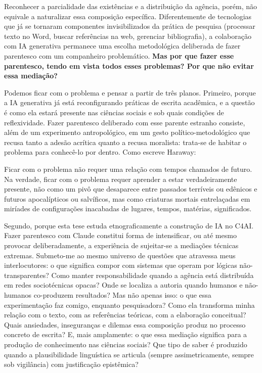 Reconhecer a parcialidade das existências e a distribuição da agência, porém, não equivale a naturalizar essa composição específica. Diferentemente de tecnologias que já se tornaram componentes invisibilizados da prática de pesquisa (processar texto no Word, buscar referências na web, gerenciar bibliografia), a colaboração com IA generativa permanece uma escolha metodológica deliberada de fazer parentesco com um companheiro problemático. \textbf{Mas por que fazer esse parentesco, tendo em vista todos esses problemas? Por que não evitar essa mediação?}

Podemos ficar com o problema e pensar a partir de três planos. Primeiro, porque a IA generativa já está reconfigurando práticas de escrita acadêmica, e a questão é como ela estará presente nas ciências sociais e sob quais condições de reflexividade. Fazer parentesco deliberado com esse parente estranho consiste, além de um experimento antropológico, em um gesto político-metodológico que recusa tanto a adesão acrítica quanto a recusa moralista: trata-se de habitar o problema para conhecê-lo por dentro. Como escreve Haraway:

\begin{citacaoabnt}
Ficar com o problema não requer uma relação com tempos chamados de futuro. Na verdade, ficar com o problema requer aprender a estar verdadeiramente presente, não como um pivô que desaparece entre passados terríveis ou edênicos e futuros apocalípticos ou salvíficos, mas como criaturas mortais entrelaçadas em miríades de configurações inacabadas de lugares, tempos, matérias, significados. \parencite[p. 1]{Haraway2016Staying}
\end{citacaoabnt}

Segundo, porque esta tese estuda etnograficamente a construção de IA no C4AI. Fazer parentesco com Claude constitui forma de intensificar, ou até mesmo provocar deliberadamente, a experiência de sujeitar-se a mediações técnicas extremas. Submeto-me ao mesmo universo de questões que atravessa meus interlocutores: o que significa compor com sistemas que operam por lógicas não-transparentes? Como manter responsabilidade quando a agência está distribuída em redes sociotécnicas opacas? Onde se localiza a autoria quando humanos e não-humanos co-produzem resultados? Mas não apenas isso: o que essa experimentação faz comigo, enquanto pesquisadora? Como ela transforma minha relação com o texto, com as referências teóricas, com a elaboração conceitual? Quais ansiedades, inseguranças e dilemas essa composição produz no processo concreto de escrita? E, mais amplamente: o que essa mediação significa para a produção de conhecimento nas ciências sociais? Que tipo de saber é produzido quando a plausibilidade linguística se articula (sempre assimetricamente, sempre sob vigilância) com justificação epistêmica?

